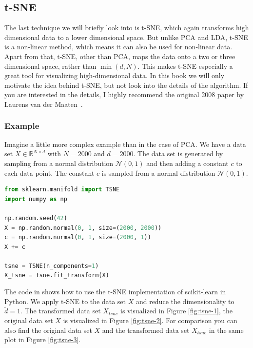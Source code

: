 \subsection{t-SNE}
The last technique we will briefly look into is t-SNE, which again transforms high dimensional data to a lower dimensional space.
But unlike PCA and LDA, t-SNE is a non-linear method, which means it can also be used for non-linear data.
Apart from that, t-SNE, other than PCA, maps the data onto a two or three dimensional space, rather than $\min(d, N)$.
This makes t-SNE especially a great tool for visualizing high-dimensional data.
In this book we will only motivate the idea behind t-SNE, but not look into the details of the algorithm.
If you are interested in the details, I highly recommend the original 2008 paper by Laurens van der Maaten~\cite{maaten2008visualizing}.
\subsubsection{Example}
Imagine a little more complex example than in the case of PCA.
We have a data set $X \in \mathbb{R}^{N \times d}$ with $N = 2000$ and $d = 2000$.
The data set is generated by sampling from a normal distribution $\mathcal{N}(0, 1)$ and then adding a constant $c$ to each data point.
The constant $c$ is sampled from a normal distribution $\mathcal{N}(0, 1)$.
\begin{lstlisting}[language=Python, caption={t-SNE in Python}, label={code:tsne}]
from sklearn.manifold import TSNE
import numpy as np

np.random.seed(42)
X = np.random.normal(0, 1, size=(2000, 2000))
c = np.random.normal(0, 1, size=(2000, 1))
X += c

tsne = TSNE(n_components=1)
X_tsne = tsne.fit_transform(X)
\end{lstlisting}
The code in  shows how to use the t-SNE implementation of scikit-learn in Python.
We apply t-SNE to the data set $X$ and reduce the dimensionality to $\tilde{d} = 1$.
The transformed data set $X_{tsne}$ is visualized in Figure \ref{fig:tsne-1}, the original data set $X$ is visualized in Figure \ref{fig:tsne-2}.
For comparison you can also find the original data set $X$ and the transformed data set $X_{tsne}$ in the same plot in Figure \ref{fig:tsne-3}.
